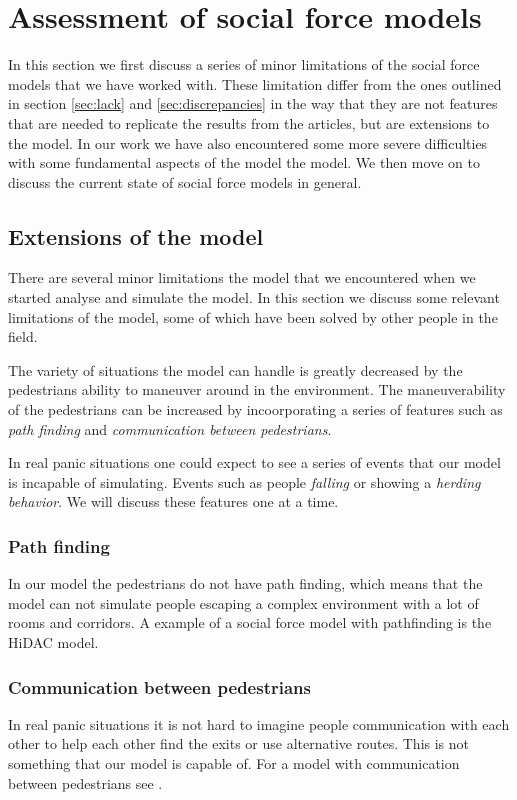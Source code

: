 \section{Assessment of social force models}
\label{sec:assessment}
In this section we first discuss a series of minor limitations of the social force models 
that we have worked with. These limitation differ from the ones outlined in 
section \ref{sec:lack} and \ref{sec:discrepancies} in the way that 
they are not features that are needed to replicate the results from the articles, 
but are extensions to the model.
In our work we have also encountered some more severe difficulties with some 
fundamental aspects of the model the model.
We then move on to discuss the current state of social force models in general. 

\subsection{Extensions of the model}
There are several minor limitations the model that we encountered when we started 
analyse and simulate the model. In this section we discuss some relevant 
limitations of the model, some of which have been solved by other people in the 
field. 

The variety of situations the model can handle is greatly decreased by the 
pedestrians ability to maneuver around in the environment. The maneuverability of 
the pedestrians can be increased by incoorporating a series of features such as 
\emph{path finding} and \emph{communication between pedestrians}. 

In real panic situations one could expect to see a series of events that our 
model is incapable of simulating. Events such as people \emph{falling} or showing a 
\emph{herding behavior}. We will discuss these features one at a time.

\subsubsection{Path finding}
In our model the pedestrians do not have path finding, which means that the model 
can not simulate people escaping a complex environment with a lot of rooms 
and corridors. A example of a social force model with pathfinding is the HiDAC 
model\cite{HiDAC}.

\subsubsection{Communication between pedestrians}
In real panic situations it is not hard to imagine people communication with 
each other to help each other find the exits or use alternative routes. This is 
not something that our model is capable of. For a model with communication between 
pedestrians see \cite{HiDAC}.

